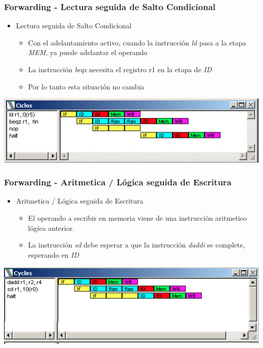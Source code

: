 \documentclass{beamer}
\begin{document}
\begin{frame}[fragile]
\frametitle{Forwarding - Lectura seguida de Salto Condicional}
\begin{itemize}
\item Lectura seguida de Salto Condicional
\begin{itemize}
\item Con el adelantamiento activo, cuando la instrucción \emph{ld} pasa a la etapa \emph{MEM}, ya puede adelantar el operando
\item La instrucción \emph{beqz} necesita el registro r1 en la etapa de \emph{ID}
\item Por lo tanto esta situación no cambia
\end{itemize}
\end{itemize}
\includegraphics[scale=0.45]{forwarding-3-lectura-beq.png}
\end{frame}


\begin{frame}[fragile]
\frametitle{Forwarding - Aritmetica / Lógica seguida de Escritura}
\begin{itemize}
\item Aritmetica / Lógica seguida de Escritura
\begin{itemize}
\item El operando a escribir en memoria viene de una instrucción aritmetico lógica anterior.
\item La instrucción \emph{sd} debe esperar a que la instrucción \emph{daddi} se complete, esperando en \emph{ID}
\end{itemize}
\end{itemize}
\includegraphics[scale=0.45]{forwarding-4.png}
\end{frame}
\end{document}
